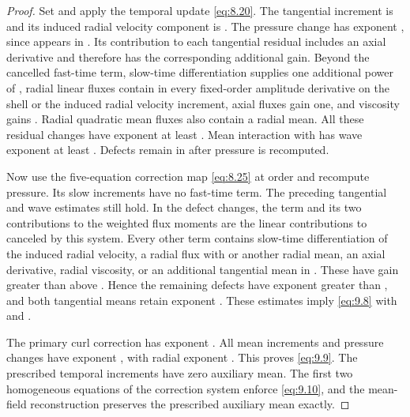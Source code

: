 \begin{proof}
Set  and apply the temporal update \eqref{eq:8.20}. The
tangential increment is  and its induced radial velocity
component is . The pressure change has exponent
, since  appears in
. Its contribution to each tangential residual includes an axial
derivative and therefore has the corresponding additional gain. Beyond the cancelled fast-time
term, slow-time differentiation supplies one additional power of ,
radial linear fluxes contain  in every fixed-order amplitude
derivative on the shell or the induced radial velocity increment, axial fluxes gain one, and viscosity
gains . Radial quadratic mean fluxes also contain a radial mean.
All these residual changes have exponent at least
. Mean interaction with
 has wave exponent at least
. Defects remain in  after pressure
is recomputed.

Now use the five-equation correction map \eqref{eq:8.25} at order
 and recompute pressure. Its slow increments have no fast-time term. The
preceding tangential and wave estimates still hold. In the defect changes, the term
 and its two contributions to the weighted flux moments are the
linear contributions to
 canceled by this
system. Every other term contains slow-time differentiation of the induced radial velocity, a radial
flux with  or another radial mean, an axial derivative, radial viscosity, or an
additional tangential mean in . These have gain greater
than  above . Hence the remaining defects have
exponent greater than , and both tangential means retain exponent
. These estimates imply \eqref{eq:9.8} with
 and .

The primary curl correction has exponent . All mean
increments and pressure changes have exponent , with radial exponent
. This proves \eqref{eq:9.9}. The prescribed temporal increments
have zero auxiliary mean. The first two homogeneous equations of the correction system enforce
\eqref{eq:9.10}, and the mean-field reconstruction preserves the prescribed auxiliary mean exactly.
\end{proof}

